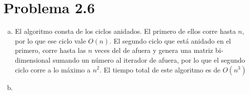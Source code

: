 \documentclass{article}
\begin{document}
\section*{Problema 2.6}

\begin{enumerate}[(a)]
    
\item El algoritmo consta de los ciclos anidados. El primero de ellos corre
hasta $n$, por lo que ese ciclo vale $O(n)$. El segundo ciclo que está anidado
en el primero, corre hasta las $n$ veces del de afuera y genera una matriz
bi-dimensional sumando un número al iterador de afuera, por lo que el segundo
ciclo corre a lo máximo a $n^2$. El tiempo total de este algoritmo es de
$O(n^3)$

\item 


\end{enumerate}
\end{document}
